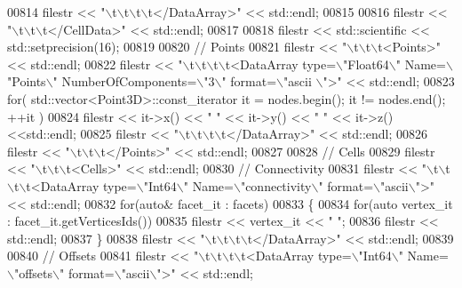 \begin{DoxyCode}
00814     filestr << \textcolor{stringliteral}{"\(\backslash\)t\(\backslash\)t\(\backslash\)t\(\backslash\)t</DataArray>"} << std::endl;
00815 
00816     filestr << \textcolor{stringliteral}{"\(\backslash\)t\(\backslash\)t\(\backslash\)t</CellData>"} << std::endl;
00817 
00818     filestr << std::scientific << std::setprecision(16);
00819 
00820     \textcolor{comment}{// Points}
00821     filestr << \textcolor{stringliteral}{"\(\backslash\)t\(\backslash\)t\(\backslash\)t<Points>"} << std::endl;
00822     filestr << \textcolor{stringliteral}{"\(\backslash\)t\(\backslash\)t\(\backslash\)t\(\backslash\)t<DataArray type=\(\backslash\)"Float64\(\backslash\)" Name=\(\backslash\)"Points\(\backslash\)" NumberOfComponents=\(\backslash\)"3\(\backslash\)" format=\(\backslash\)"ascii
      \(\backslash\)">"} << std::endl;
00823     \textcolor{keywordflow}{for}( std::vector<Point3D>::const\_iterator it = nodes.begin(); it != nodes.end(); ++it )
00824         filestr << it->x() << \textcolor{stringliteral}{" "} << it->y() << \textcolor{stringliteral}{" "} << it->z() <<std::endl;
00825     filestr << \textcolor{stringliteral}{"\(\backslash\)t\(\backslash\)t\(\backslash\)t\(\backslash\)t</DataArray>"} << std::endl;
00826     filestr << \textcolor{stringliteral}{"\(\backslash\)t\(\backslash\)t\(\backslash\)t</Points>"} << std::endl;
00827 
00828     \textcolor{comment}{// Cells}
00829     filestr << \textcolor{stringliteral}{"\(\backslash\)t\(\backslash\)t\(\backslash\)t<Cells>"} << std::endl;
00830     \textcolor{comment}{//  Connectivity}
00831     filestr << \textcolor{stringliteral}{"\(\backslash\)t\(\backslash\)t\(\backslash\)t\(\backslash\)t<DataArray type=\(\backslash\)"Int64\(\backslash\)" Name=\(\backslash\)"connectivity\(\backslash\)" format=\(\backslash\)"ascii\(\backslash\)">"} << std::endl;
00832     \textcolor{keywordflow}{for}(\textcolor{keyword}{auto}& facet\_it : facets)
00833     \{
00834         \textcolor{keywordflow}{for}(\textcolor{keyword}{auto} vertex\_it : facet\_it.getVerticesIds())
00835             filestr << vertex\_it << \textcolor{stringliteral}{" "};
00836         filestr << std::endl;
00837     \}
00838     filestr << \textcolor{stringliteral}{"\(\backslash\)t\(\backslash\)t\(\backslash\)t\(\backslash\)t</DataArray>"} << std::endl;
00839 
00840     \textcolor{comment}{//  Offsets}
00841     filestr << \textcolor{stringliteral}{"\(\backslash\)t\(\backslash\)t\(\backslash\)t\(\backslash\)t<DataArray type=\(\backslash\)"Int64\(\backslash\)" Name=\(\backslash\)"offsets\(\backslash\)" format=\(\backslash\)"ascii\(\backslash\)">"} << std::endl;

\end{DoxyCode}
